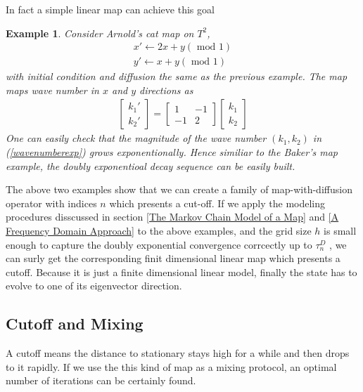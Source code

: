 \documentclass{article}
\newtheorem{example}{Example}
\begin{document}
In fact a simple linear map can achieve this goal
\begin{example}

Consider Arnold's cat map on $T^2$,
  \begin{eqnarray}
               x' \leftarrow  2x+y (\mbox{ mod } 1)\\
               y' \leftarrow  x+y (\mbox{ mod } 1) \nonumber
  \end{eqnarray}
with initial condition and diffusion the same as the previous
example. The map maps wave number in $x$ and $y$ directions as
  \begin{eqnarray}
  \label{wavenumberexp}
    \left[\begin{array}{c}
           k_1'\\
           k_2'
    \end{array}\right] =
    \left[\begin{array}{cc}
           1& -1\\
           -1& 2
    \end{array}\right]
    \left[\begin{array}{c}
           k_1\\
           k_2
    \end{array}\right]
  \end{eqnarray}
One can easily check that the magnitude of the wave number $(k_1,k_2)$
in (\ref{wavenumberexp}) grows exponentionally. Hence similiar to the Baker's
map example, the doubly exponentioal decay sequence can be easily built.
\end{example}

The above two examples show that we can create a family of
map-with-diffusion operator with indices $n$ which presents a
cut-off. If we apply the modeling procedures disscussed in section
\ref{The Markov Chain Model of a Map} and \ref{A Frequency Domain
Approach} to the above examples, and the grid size $h$ is small
enough to capture the doubly exponential convergence corrcectly up
to $\tau^D_n$ , we can surly get the corresponding finit dimensional
linear map which presents a cutoff. Because it is just a finite
dimensional linear model, finally the state has to evolve to one of
its eigenvector direction. 


\subsection{Cutoff and Mixing}
\label{Cutoff and Mixing}
A cutoff means the distance to stationary stays high for a while and then drops
to it rapidly. If we use the this kind of map as a mixing protocol, an optimal
number of iterations can be certainly found.
\end{document}
